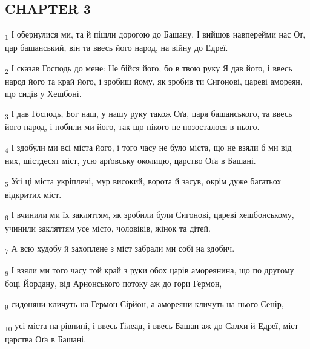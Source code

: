 \subsection{CHAPTER 3}
\begin{tcolorbox}
\textsubscript{1} І обернулися ми, та й пішли дорогою до Башану. І вийшов навперейми нас Оґ, цар башанський, він та ввесь його народ, на війну до Едреї.
\end{tcolorbox}
\begin{tcolorbox}
\textsubscript{2} І сказав Господь до мене: Не бійся його, бо в твою руку Я дав його, і ввесь народ його та край його, і зробиш йому, як зробив ти Сигонові, цареві амореян, що сидів у Хешбоні.
\end{tcolorbox}
\begin{tcolorbox}
\textsubscript{3} І дав Господь, Бог наш, у нашу руку також Оґа, царя башанського, та ввесь його народ, і побили ми його, так що нікого не позосталося в нього.
\end{tcolorbox}
\begin{tcolorbox}
\textsubscript{4} І здобули ми всі міста його, і того часу не було міста, що не взяли б ми від них, шістдесят міст, усю арґовську околицю, царство Оґа в Башані.
\end{tcolorbox}
\begin{tcolorbox}
\textsubscript{5} Усі ці міста укріплені, мур високий, ворота й засув, окрім дуже багатьох відкритих міст.
\end{tcolorbox}
\begin{tcolorbox}
\textsubscript{6} І вчинили ми їх закляттям, як зробили були Сигонові, цареві хешбонському, учинили закляттям усе місто, чоловіків, жінок та дітей.
\end{tcolorbox}
\begin{tcolorbox}
\textsubscript{7} А всю худобу й захоплене з міст забрали ми собі на здобич.
\end{tcolorbox}
\begin{tcolorbox}
\textsubscript{8} І взяли ми того часу той край з руки обох царів амореянина, що по другому боці Йордану, від Арнонського потоку аж до гори Гермон,
\end{tcolorbox}
\begin{tcolorbox}
\textsubscript{9} сидоняни кличуть на Гермон Сірйон, а амореяни кличуть на нього Сенір,
\end{tcolorbox}
\begin{tcolorbox}
\textsubscript{10} усі міста на рівнині, і ввесь Ґілеад, і ввесь Башан аж до Салхи й Едреї, міст царства Оґа в Башані.
\end{tcolorbox}
